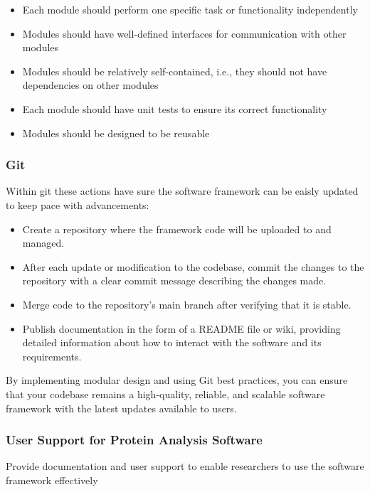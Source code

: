 \documentclass[]{final_report}
\begin{document}
\begin{itemize}
    \item Each module should perform one specific task or functionality independently
    \item Modules should have well-defined interfaces for communication with other modules
    \item Modules should be relatively self-contained, i.e., they should not have dependencies on other modules
    \item Each module should have unit tests to ensure its correct functionality
    \item Modules should be designed to be reusable
\end{itemize}


\subsubsection{Git}
Within git these actions have sure the software framework can be eaisly updated to keep pace with advancements:

\begin{itemize}
    \item Create a repository where the framework code will be uploaded to and managed.
    \item After each update or modification to the codebase, commit the changes to the repository with a clear commit message describing the changes made.
    \item Merge code to the repository's main branch after verifying that it is stable.
    \item Publish documentation in the form of a README file or wiki, providing detailed information about how to interact with the software and its requirements.
\end{itemize}

By implementing modular design and using Git best practices, you can ensure that your codebase remains a high-quality, reliable, and scalable software framework with the latest updates available to users.
\clearpage

\subsubsection{User Support for Protein Analysis Software}
\begin{displayquote}
    Provide documentation and user support to enable researchers to use the software
    framework effectively
\end{displayquote}
\end{document}
